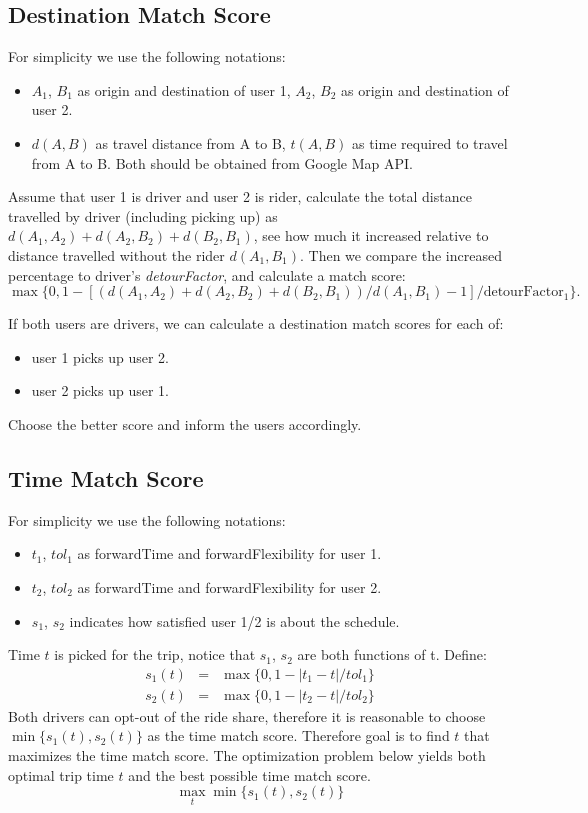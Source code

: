 \documentclass{article}
\begin{document}
\subsection{Destination Match Score}
For simplicity we use the following notations:
\begin{itemize}
\item $A_1$, $B_1$ as origin and destination of user 1, $A_2$, $B_2$ as origin and destination of user 2.
\item $d(A, B)$ as travel distance from A to B, $t(A,B)$ as time required to travel from A to B.  Both should be obtained from Google Map API.
\end{itemize}
Assume that user 1 is driver and user 2 is rider, calculate the total distance travelled by driver (including picking up) as $d(A_1, A_2) + d(A_2,B_2) + d(B_2, B_1)$, see how much it increased relative to distance travelled without the rider $d(A_1, B_1)$.  Then we compare the increased percentage to driver's \textit{detourFactor}, and calculate a match score:
\begin{equation*}
\max\{0, 1- [\left(d(A_1, A_2) + d(A_2,B_2) + d(B_2, B_1)\right)/d(A_1, B_1)-1]/\mbox{detourFactor}_1 \}.
\end{equation*}

If both users are drivers, we can calculate a destination match scores for each of:
\begin{itemize}
\item user 1 picks up user 2.
\item user 2 picks up user 1.
\end{itemize}
Choose the better score and inform the users accordingly.

\subsection{Time Match Score}
For simplicity we use the following notations:
\begin{itemize}
\item $t_1$, $tol_1$ as forwardTime and forwardFlexibility for user 1.
\item $t_2$, $tol_2$ as forwardTime and forwardFlexibility for user 2.
\item $s_1$, $s_2$ indicates how satisfied user 1/2 is about the schedule.
\end{itemize}
Time $t$ is picked for the trip, notice that $s_1$, $s_2$ are both functions of t.  Define:
\begin{eqnarray*}
s_1(t) &=& \max\{ 0, 1-|t_1-t|/tol_1\}\\
s_2(t) &=& \max\{ 0, 1-|t_2-t|/tol_2\}
\end{eqnarray*}
Both drivers can opt-out of the ride share, therefore it is reasonable to choose $\min\{ s_1(t), s_2(t)\}$ as the time match score.  Therefore goal is to find $t$ that maximizes the time match score.  The optimization problem below yields both optimal trip time $t$ and the best possible time match score.
\begin{equation*}
\max_t \min\{ s_1(t), s_2(t)\}
\end{equation*}
\end{document}

